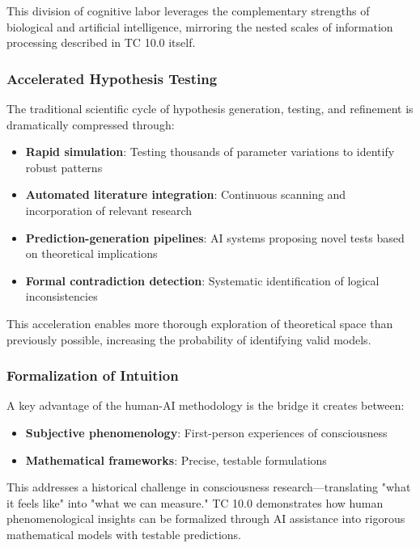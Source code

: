\documentclass[12pt]{article}
\begin{document}
This division of cognitive labor leverages the complementary strengths of biological and artificial intelligence, mirroring the nested scales of information processing described in TC 10.0 itself.

\subsubsection{Accelerated Hypothesis Testing}

The traditional scientific cycle of hypothesis generation, testing, and refinement is dramatically compressed through:

\begin{itemize}
    \item \textbf{Rapid simulation}: Testing thousands of parameter variations to identify robust patterns
    \item \textbf{Automated literature integration}: Continuous scanning and incorporation of relevant research
    \item \textbf{Prediction-generation pipelines}: AI systems proposing novel tests based on theoretical implications
    \item \textbf{Formal contradiction detection}: Systematic identification of logical inconsistencies
\end{itemize}

This acceleration enables more thorough exploration of theoretical space than previously possible, increasing the probability of identifying valid models.

\subsubsection{Formalization of Intuition}

A key advantage of the human-AI methodology is the bridge it creates between:

\begin{itemize}
    \item \textbf{Subjective phenomenology}: First-person experiences of consciousness
    \item \textbf{Mathematical frameworks}: Precise, testable formulations
\end{itemize}

This addresses a historical challenge in consciousness research—translating "what it feels like" into "what we can measure." TC 10.0 demonstrates how human phenomenological insights can be formalized through AI assistance into rigorous mathematical models with testable predictions.
\end{document}
